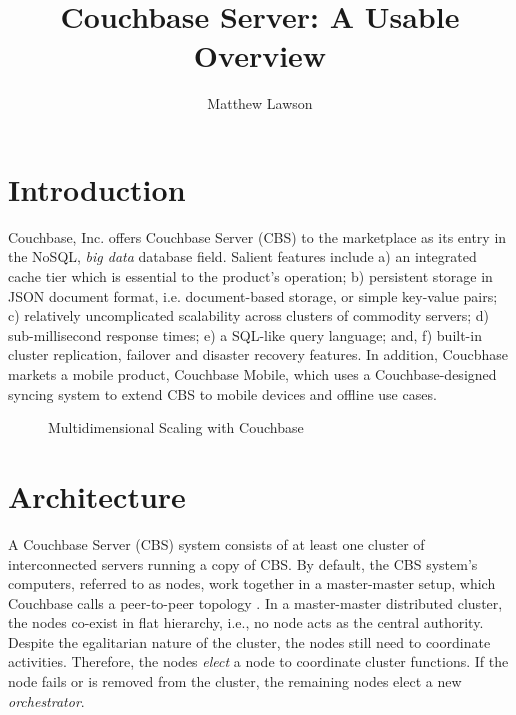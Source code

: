 \documentclass[9pt,twocolumn,twoside]{styles/osajnl}
\title{Couchbase Server: A Usable Overview}
\author[1]{Matthew Lawson}
\affil[1]{School of Informatics and Computing, Bloomington, IN 47408, U.S.A.}
\affil[*]{Corresponding authors: laszewski@gmail.com}
\begin{document}
\maketitle

\section{Introduction}

Couchbase, Inc. offers Couchbase Server (CBS) to the marketplace as its entry in the NoSQL, \textit{big data} database field.  Salient features include a) an integrated cache tier which is essential to the product's operation; b) persistent storage in JSON document format, i.e. document-based storage, or simple key-value pairs; c) relatively uncomplicated scalability across clusters of commodity servers; d) sub-millisecond response times; e) a SQL-like query language; and, f) built-in cluster replication, failover and disaster recovery features.  In addition, Coucbhase markets a mobile product, Couchbase Mobile, which uses a Couchbase-designed syncing system to extend CBS to mobile devices and offline use cases.

\begin{figure}[htbp]
\centering
{}
\caption{Multidimensional Scaling with Couchbase \cite{www-components-cbsinc}}
\label{fig:multidim scaling}
\end{figure}

\section{Architecture} 

A Couchbase Server (CBS) system consists of at
least one cluster of interconnected servers running a copy of CBS. By
default, the CBS system's computers, referred to as nodes, work together in a master-master setup, which Couchbase calls a peer-to-peer topology \cite{www-components-cbsinc}.  In a master-master distributed cluster, the nodes co-exist in flat hierarchy, i.e., no node acts as the central authority.  Despite the egalitarian nature of the cluster, the nodes still need to coordinate activities.  Therefore, the nodes \textit{elect} a node to coordinate cluster functions. If the node fails or is removed from the cluster, the remaining  nodes elect a new \textit{orchestrator}.
\end{document}

